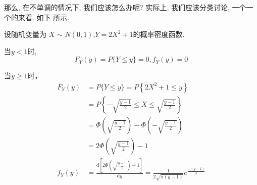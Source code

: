 那么, 在不单调的情况下, 我们应该怎么办呢? 实际上, 我们应该分类讨论, 一个一个的来看. 如下
所示. 

\begin{example}
  设随机变量为 $X$ $\sim$ $N (0, 1)$,$Y = 2X^2+1$的概率密度函数.
\end{example}

\begin{solution}
  当$y < 1$时,
    \[ F_Y(y) = P\{Y \leq y \} = 0,f_Y(y) = 0\]

    \quad 当$y \geq 1$时，
    \begin{align*}
    F_Y(y) & =  P\{Y \leq y\}=P\left\{2 X^2+1 \leq y\right\} \\
    & =P\left\{-\sqrt{\frac{y-1}{2}} \leq X\right.  \left.\leq \sqrt{\frac{y-1}{2}}\right\}\\
    &=\Phi\left(\sqrt{\frac{y-1}{2}}\right)-\Phi\left(-\sqrt{\frac{y-1}{2}}\right) \\
    & =2 \Phi\left(\sqrt{\frac{y-1}{2}}\right)-1\\
    f_Y(y) &= \frac{\mathrm{d}[2\Phi(\sqrt{\frac{y-1}{2}}) - 1]}{\mathrm{d}y} = \frac{1}{2\sqrt{\pi(y-1)}}e^{\frac{-(y-1)}{4}}
    \end{align*}
\end{solution}






